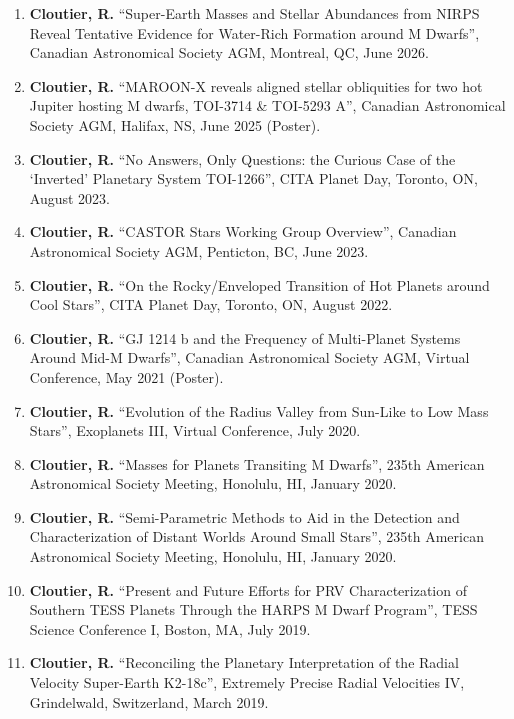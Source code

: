 \documentclass[12pt]{article}
\begin{document}

\begin{enumerate}
\item {\bf Cloutier, R.} ``Super-Earth Masses and Stellar Abundances from NIRPS Reveal Tentative Evidence for Water-Rich Formation around M Dwarfs'', Canadian Astronomical Society AGM, Montreal, QC, June 2026.
\item {\bf Cloutier, R.} ``MAROON-X reveals aligned stellar obliquities for two hot Jupiter hosting M dwarfs, TOI-3714 \& TOI-5293 A'', Canadian Astronomical Society AGM, Halifax, NS, June 2025 (Poster).
\item {\bf Cloutier, R.} ``No Answers, Only Questions: the Curious Case of the `Inverted' Planetary System TOI-1266'', CITA Planet Day, Toronto, ON, August 2023.
\item {\bf Cloutier, R.} ``CASTOR Stars Working Group Overview'', Canadian Astronomical Society AGM, Penticton, BC, June 2023.
\item {\bf Cloutier, R.} ``On the Rocky/Enveloped Transition of Hot Planets around Cool Stars'', CITA Planet Day, Toronto, ON, August 2022.
\item {\bf Cloutier, R.} ``GJ 1214 b and the Frequency of Multi-Planet Systems Around Mid-M Dwarfs'', Canadian Astronomical Society AGM, Virtual Conference, May 2021 (Poster).
\item {\bf Cloutier, R.} ``Evolution of the Radius Valley from Sun-Like to Low Mass Stars'', Exoplanets III, Virtual Conference, July 2020.
\item {\bf Cloutier, R.} ``Masses for Planets Transiting M Dwarfs'', 235th American Astronomical Society Meeting, Honolulu, HI, January 2020.
\item {\bf Cloutier, R.} ``Semi-Parametric Methods to Aid in the Detection and Characterization of Distant Worlds Around Small Stars'', 235th American Astronomical Society Meeting, Honolulu, HI, January 2020.
\item {\bf Cloutier, R.} ``Present and Future Efforts for PRV Characterization of Southern TESS Planets Through the HARPS M Dwarf Program'', TESS Science Conference I, Boston, MA, July 2019.
\item {\bf Cloutier, R.} ``Reconciling the Planetary Interpretation of the Radial Velocity Super-Earth K2-18c'', Extremely Precise Radial Velocities IV, Grindelwald, Switzerland, March 2019.

\end{enumerate}
\end{document}
